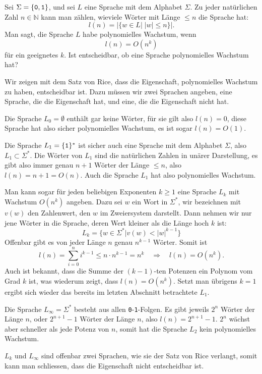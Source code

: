 Sei $\Sigma=\{\text{\tt 0},\text{\tt 1}\}$, und sei $L$ eine Sprache
mit dem Alphabet $\Sigma$. Zu jeder natürlichen Zahl $n\in\mathbb N$
kann man zählen, wieviele Wörter mit Länge $\le n$ die Sprache
hat:
\[
l(n)=|\{w\in L|\;|w|\le n\}|.
\]
Man sagt, die Sprache $L$ habe polynomielles Wachstum, wenn
\[
l(n)=O(n^k)
\]
für ein geeignetes $k$. Ist entscheidbar, ob eine Sprache polynomielles
Wachstum hat?

\begin{loesung}
Wir zeigen mit dem Satz von Rice, dass die Eigenschaft, polynomielles
Wachstum zu haben, entscheidbar ist. Dazu müssen wir zwei Sprachen
angeben, eine Sprache, die die Eigenschaft hat, und eine, die die
Eigenschaft nicht hat.

Die Sprache $L_0=\emptyset$ enthält gar keine Wörter, für sie
gilt also $l(n)=0$, diese Sprache hat also sicher polynomielles
Wachstum, es ist sogar $l(n)=O(1)$.

Die Sprache $L_1=\{\text{\tt 1}\}^*$ ist sicher auch eine Sprache mit
dem Alphabet $\Sigma$, also $L_1\subset \Sigma^*$. Die Wörter
von $L_1$ sind die natürlichen Zahlen in unärer Darstellung,
es gibt also immer genau $n+1$ Wörter der Länge $\le n$, also
$l(n)=n+1=O(n)$. Auch die Sprache $L_1$ hat also polynomielles Wachstum.

Man kann sogar für jeden beliebigen Exponenten $k\ge 1$ eine Sprache $L_k$
mit Wachstum $O(n^k)$ angeben. Dazu sei $w$ ein Wort in $\Sigma^*$,
wir bezeichnen mit $v(w)$ den Zahlenwert, den $w$ im Zweiersystem
darstellt. Dann nehmen wir nur jene Wörter in die Sprache,
deren Wert kleiner als die Länge hoch $k$ ist:
\[
L_k=\{ w\in\Sigma^*| v(w) < |w|^{k-1}\}
\]
Offenbar gibt es von jeder Länge $n$ genau $n^{k-1}$ Wörter.
Somit ist
\[
l(n)=\sum_{i=0}^ni^{k-1}\le n\cdot n^{k-1}=n^k\quad\Rightarrow\quad l(n)=O(n^k).
\]
Auch ist bekannt, dass die Summe der $(k-1)$-ten Potenzen ein
Polynom vom Grad $k$ ist, was wiederum zeigt, dass $l(n)=O(n^k)$.
Setzt man übrigens $k=1$ ergibt
sich wieder das bereits im letzten Abschnitt betrachtete
$L_1$.

Die Sprache $L_\infty=\Sigma^*$ besteht aus allen {\tt 0}-{\tt 1}-Folgen.
Es gibt jeweils $2^n$ Wörter der Länge $n$, oder $2^{n+1}-1$ Wörter
der Länge $n$, also $l(n)=2^{n+1}-1$. $2^n$ wächst aber schneller
als jede Potenz von $n$, somit hat die Sprache $L_2$ kein polynomielles
Wachstum.

$L_k$ und $L_\infty$ sind offenbar zwei Sprachen, wie sie der Satz von
Rice verlangt, somit kann man schliessen, dass die Eigenschaft
nicht entscheidbar ist.
\end{loesung}
